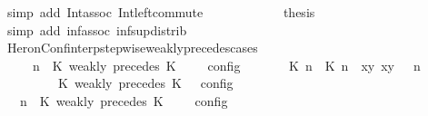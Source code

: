 \begin{isabellebody}
\ {\isacharparenleft}simp\ add{\isacharcolon}\ Int{\isacharunderscore}assoc\ Int{\isacharunderscore}left{\isacharunderscore}commute{\isacharparenright}\isanewline
\ \ \ \ \isamarkupfalse%
\isanewline
\ \ \ \ \isamarkupfalse%
\ \isamarkupfalse%
\ {\isacharquery}thesis\ \isamarkupfalse%
\ {\isacharparenleft}simp\ add{\isacharcolon}\ inf{\isacharunderscore}assoc\ inf{\isacharunderscore}sup{\isacharunderscore}distrib{}{\isacharparenright}\isanewline
\ \ \isamarkupfalse%
\isanewline
{}\isamarkupfalse%
%
\endisatagproof
{\isafoldproof}%
%
\isadelimproof
\isanewline
%
\endisadelimproof
\isanewline
{}\isamarkupfalse%
\ HeronConf{\isacharunderscore}interp{\isacharunderscore}stepwise{\isacharunderscore}weakly{\isacharunderscore}precedes{\isacharunderscore}cases{\isacharcolon}\isanewline
\ \ \ {\isacartoucheopen}{\isasymlbrakk}\ {\isasymGamma}{\isacharcomma}\ n\ {\isasymturnstile}\ {\isacharparenleft}{\isacharparenleft}K\ weakly\ precedes\ K\ {\isacharhash}\ {\isasymPsi}{\isacharparenright}\ {\isasymtriangleright}\ {\isasymPhi}\ {\isasymrbrakk}\isactrlsub c\isactrlsub o\isactrlsub n\isactrlsub f\isactrlsub i\isactrlsub g\isanewline
\ \ \ \ {\isacharequal}\ {\isasymlbrakk}\ {\isacharparenleft}{\isacharparenleft}{\isasymlceil}{\isacharhash}\isactrlsup {\isasymle}\ K\ n{\isacharcomma}\ {\isacharhash}\isactrlsup {\isasymle}\ K\ n{\isasymrceil}\ {\isasymin}\ {\isacharparenleft}{\isasymlambda}{\isacharparenleft}x{\isacharcomma}y{\isacharparenright}{\isachardot}\ x{\isasymle}y{\isacharparenright}{\isacharparenright}\ {\isacharhash}\ {\isasymGamma}{\isacharparenright}{\isacharcomma}\ n\isanewline
\ \ \ \ \ \ {\isasymturnstile}\ {\isasymPsi}\ {\isasymtriangleright}\ {\isacharparenleft}{\isacharparenleft}K\ weakly\ precedes\ K\ {\isacharhash}\ {\isasymPhi}{\isacharparenright}\ {\isasymrbrakk}\isactrlsub c\isactrlsub o\isactrlsub n\isactrlsub f\isactrlsub i\isactrlsub g{\isacartoucheclose}\isanewline
%
\isadelimproof
%
\endisadelimproof
%
\isatagproof
{}\isamarkupfalse%
\ {\isacharminus}\isanewline
\ \ \isamarkupfalse%
\ {\isacartoucheopen}{\isasymlbrakk}\ {\isasymGamma}{\isacharcomma}\ n\ {\isasymturnstile}\ {\isacharparenleft}K\ weakly\ precedes\ K\ {\isacharhash}\ {\isasymPsi}\ {\isasymtriangleright}\ {\isasymPhi}\ {\isasymrbrakk}\isactrlsub c\isactrlsub o\isactrlsub n\isactrlsub f\isactrlsub i\isactrlsub g\isanewline

\end{isabellebody}
